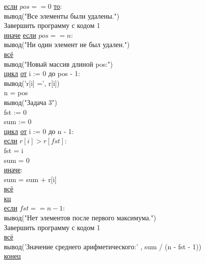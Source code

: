 \noindent\null\qquad\underline{если} \(pos == 0\) \underline{то}:\\
\null\qquad\null\qquad вывод("Все элементы были удалены.")\\
\null\qquad\null\qquad Завершить программу с кодом 1\\
\null\qquad\underline{иначе} \underline{если} \(pos == n\):\\
\null\qquad\null\qquad вывод("Ни один элемент не был удален.")\\
\null\qquad\underline{всё}\\[0.3cm]

\noindent\null\qquad вывод("Новый массив длиной pos:")\\
\null\qquad\underline{цикл} \underline{от} i := 0 до pos - 1:\\
\null\qquad\null\qquad вывод('r[i] =', r[i])\\
\noindent\null\qquad n = pos\\[0.3cm]

\noindent\null\qquad вывод("Задача 3")\\
\null\qquad fst := 0\\
\null\qquad sum := 0\\[0.3cm]

\noindent\null\qquad\underline{цикл} \underline{от} i := 0 до n - 1:\\
\null\qquad\null\qquad \underline{если} \(r[i] > r[fst]\):\\
\null\qquad\null\qquad\qquad fst = i\\
\null\qquad\null\qquad\qquad sum = 0\\
\null\qquad\null\qquad \underline{иначе}:\\
\null\qquad\null\qquad\qquad sum = sum + r[i]\\
\null\qquad\null\qquad \underline{всё}\\
\null\qquad\underline{кц}\\[0.3cm]

\noindent\null\qquad\underline{если} \(fst == n - 1\):\\
\null\qquad\null\qquad вывод("Нет элементов после первого максимума.")\\
\null\qquad\null\qquad Завершить программу с кодом 1\\
\null\qquad\underline{всё}\\[0.3cm]

\noindent\null\qquad вывод('Значение среднего арифметического:' , sum / (n - fst - 1))\\
\underline{конец}
